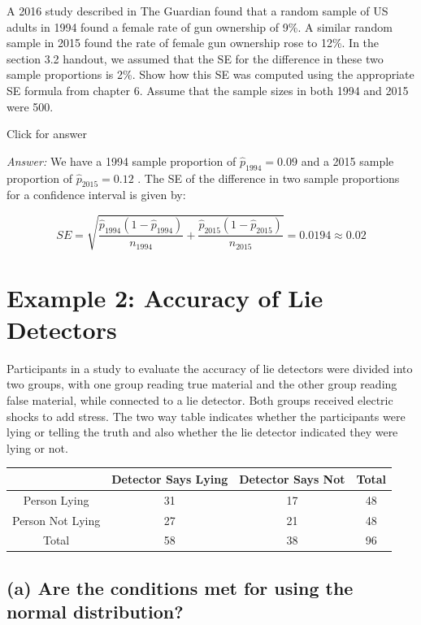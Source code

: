 \documentclass[
]{book}
\begin{document}
A 2016 study described in The Guardian found that a random sample of US adults in 1994 found a female rate of gun ownership of 9\%. A similar random sample in 2015 found the rate of female gun ownership rose to 12\%. In the section 3.2 handout, we assumed that the SE for the difference in these two sample proportions is 2\%. Show how this SE was computed using the appropriate SE formula from chapter 6. Assume that the sample sizes in both 1994 and 2015 were 500.

Click for answer

\emph{Answer:}
We have a 1994 sample proportion of \(\hat{p}_{1994} = 0.09\) and a 2015 sample proportion of \(\hat{p}_{2015} = 0.12\) . The SE of the difference in two sample proportions for a confidence interval is given by:

\[SE = \sqrt{\frac{\hat{p}_{1994} (1 - \hat{p}_{1994} )}{n_{1994}} + \frac{\hat{p}_{2015} (1 - \hat{p}_{2015} )}{n_{2015}}} = 0.0194 \approx 0.02 \]

\hypertarget{example-2-accuracy-of-lie-detectors}{%
\section{Example 2: Accuracy of Lie Detectors}\label{example-2-accuracy-of-lie-detectors}}

Participants in a study to evaluate the accuracy of lie detectors were divided into two groups, with one group reading true material and the other group reading false material, while connected to a lie detector. Both groups received electric shocks to add stress. The two way table indicates whether the participants were lying or telling the truth and also whether the lie detector indicated they were lying or not.

\begin{tabular}{|c|c|c|c|} \hline
& {Detector Says Lying} & {Detector Says Not} & {Total}\\  \hline
{Person Lying} & 31 & 17 & 48 \\ \hline
{Person Not Lying} & 27 & 21 & 48 \\ \hline
{Total} & 58 & 38 & 96 \\ \hline
\end{tabular}

\hypertarget{a-are-the-conditions-met-for-using-the-normal-distribution}{%
\subsection{(a) Are the conditions met for using the normal distribution?}\label{a-are-the-conditions-met-for-using-the-normal-distribution}}
\end{document}
